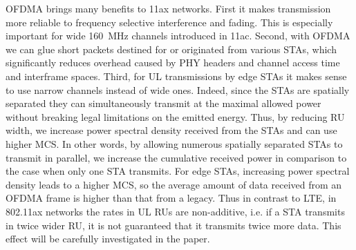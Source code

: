 OFDMA brings many benefits to 11ax networks.
First it makes transmission more reliable to frequency selective interference and fading.
This is especially important for wide \SI{160}{MHz} channels introduced in 11ac.
Second, with OFDMA we can glue short packets destined for or originated from various STAs, which significantly reduces overhead caused by PHY headers and channel access time and interframe spaces.
Third, for UL transmissions by edge STAs it makes sense to use narrow channels instead of wide ones.
Indeed, since the STAs are spatially separated they can simultaneously transmit at the maximal allowed power without breaking legal limitations on the emitted energy.
Thus, by reducing RU width, we increase power spectral density received from the STAs and can use higher MCS.
In other words, by allowing numerous spatially separated STAs to transmit in parallel, we increase the cumulative received power in comparison to the case when only one STA transmits.
For edge STAs, increasing power spectral density leads to a higher MCS, so  the average amount of data received from an OFDMA frame is higher than that from a legacy.
Thus in contrast to LTE, in 802.11ax networks the rates in UL RUs are non-additive, i.e. if a STA transmits in twice wider RU, it is not guaranteed that it transmits twice more data.
This effect will be carefully investigated in the paper.
%
%
%
%
%
%
%
%
%



